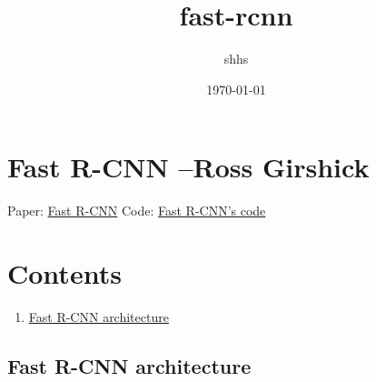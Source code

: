 \documentclass[11pt]{article}
\title{fast-rcnn}
\author{shhs}
\date{\today}
\begin{document}
\maketitle

\setcounter{tocdepth}{3}
\tableofcontents
\vspace*{1cm}

\section{Fast R-CNN --Ross Girshick}
\label{sec-1}


Paper: \href{http://arxiv.org/abs/1504.08083}{Fast R-CNN}
Code: \href{https://github.com/rbgirshick/fast-rcnn}{Fast R-CNN's code}
\section{Contents}
\label{sec-2}

\begin{enumerate}
\item \hyperref[sec-2-1]{Fast R-CNN architecture}
\end{enumerate}
\subsection{Fast R-CNN architecture}
\label{sec-2-1}
\end{document}
